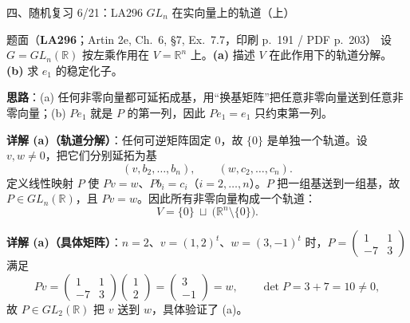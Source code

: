 \documentclass[aspectratio=169,10pt,fontset=none]{ctexbeamer}
\newcommand{\ex}[1]{\textcolor{accent}{\footnotesize\bfseries #1}}
\newcommand{\key}[1]{\textcolor{ink}{\bfseries #1}}
\begin{document}
\begin{frame}[t]{四、随机复习 6/21：LA296 $GL_n$ 在实向量上的轨道（上）}
\label{ex:LA296}
\scriptsize
\begin{block}{\footnotesize 题面（\ex{LA296}；Artin 2e, Ch.~6, §7, Ex.~7.7，印刷 p.~191 / PDF p.~203）}
设 $G=GL_n(\mathbb R)$ 按左乘作用在 $V=\mathbb R^n$ 上。\textbf{(a)} 描述 $V$ 在此作用下的轨道分解。\textbf{(b)} 求 $e_1$ 的稳定化子。
\end{block}
\key{思路}：(a) 任何非零向量都可延拓成基，用“换基矩阵”把任意非零向量送到任意非零向量；(b) $Pe_1$ 就是 $P$ 的第一列，因此 $Pe_1=e_1$ 只约束第一列。

\key{详解 (a)（轨道分解）}：任何可逆矩阵固定 $0$，故 $\{0\}$ 是单独一个轨道。设 $v,w\ne0$，把它们分别延拓为基
\[ (v,b_2,\dots,b_n),\qquad (w,c_2,\dots,c_n). \]
定义线性映射 $P$ 使 $Pv=w$、$Pb_i=c_i$（$i=2,\dots,n$）。$P$ 把一组基送到一组基，故 $P\in GL_n(\mathbb R)$，且 $Pv=w$。因此所有非零向量构成一个轨道：
\[ V=\{0\}\ \sqcup\ \bigl(\mathbb R^n\setminus\{0\}\bigr). \]

\key{详解 (a)（具体矩阵）}：$n=2$、$v=(1,2)^t$、$w=(3,-1)^t$ 时，$P=\begin{pmatrix}1&1\\-7&3\end{pmatrix}$ 满足
\[ P v=\begin{pmatrix}1&1\\-7&3\end{pmatrix}\begin{pmatrix}1\\2\end{pmatrix}=\begin{pmatrix}3\\-1\end{pmatrix}=w,\qquad \det P=3+7=10\ne0, \]
故 $P\in GL_2(\mathbb R)$ 把 $v$ 送到 $w$，具体验证了 (a)。
\end{frame}
\end{document}
